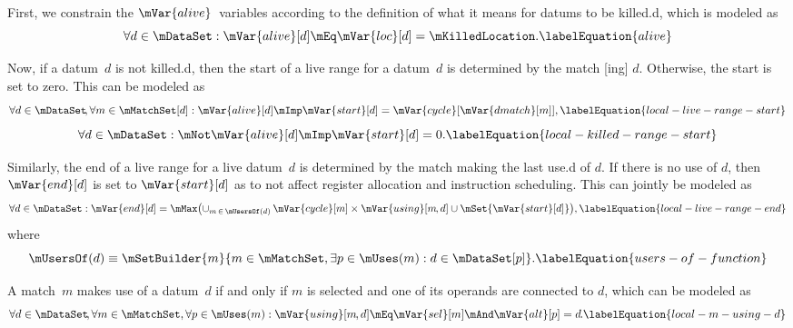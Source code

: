 First, we constrain the $\mVar{alive}$~\glspl{variable} according to the
definition of what it means for \glspl{datum} to be \gls{killed.d}, which is
modeled as
%
\begin{equation}
  \forall d \in \mDataSet :
  \mVar{alive}[d]
  \mEq
  \mVar{loc}[d] = \mKilledLocation.
  \labelEquation{alive}
\end{equation}

Now, if a \gls{datum}~$d$ is not \gls{killed.d}, then the start of a \gls{live
  range} for a \gls{datum}~$d$ is determined by the \gls{match}
[ing] $d$\hspace{-1pt}.
%
Otherwise, the start is set to zero.
%
This can be modeled as
%
\begin{equation}
  \forall d \in \mDataSet \!,
  \forall m \in \mMatchSet[d] :
  \mVar{alive}[d]
  \mImp
  \mVar{start}[d] = \mVar{cycle}[\mVar{dmatch}[m]],
  \labelEquation{local-live-range-start}
\end{equation}
%
\begin{equation}
  \forall d \in \mDataSet :
  \mNot\mVar{alive}[d]
  \mImp
  \mVar{start}[d] = 0.
  \labelEquation{local-killed-range-start}
\end{equation}

Similarly, the end of a \gls{live range} for a live \gls{datum}~$d$ is
determined by the \gls{match} making the last \gls{use.d} of $d$\hspace{-1pt}.
%
If there is no use of $d$, then $\mVar{end}[d]$ is set to $\mVar{start}[d]$ as
to not affect \gls{register allocation} and \gls{instruction scheduling}.
%
This can jointly be modeled as
%
\begin{equation}
  \forall d \in \mDataSet :
  \mVar{end}[d] =
  \mMax\!
  \left(
    \cup_{m \,\in\, \mUsersOf(d)} \,
    \mVar{cycle}[m]
    \times
    \mVar{using}[m \hspace{-1pt}, d]
    \cup
    \mSet{\mVar{start}[d]}
  \right)\!,
  \labelEquation{local-live-range-end}
\end{equation}
%
where
%
\begin{equation}
  \mUsersOf(d)
  \equiv
  \mSetBuilder{m}%
              {
                m \in \mMatchSet,
                \exists p \in \mUses(m) :
                d \in \mDataSet[p]
              }.
  \labelEquation{users-of-function}
\end{equation}

A \gls{match}~$m$ makes use of a \gls{datum}~$d$ if and only if $m$ is selected
and one of its \glspl{operand} are connected to $d$\hspace{-1pt}, which can be
modeled as
%
\begin{equation}
  \forall d \in \mDataSet \!,
  \forall m \in \mMatchSet,
  \forall p \in \mUses(m) :
  \mVar{using}[m \hspace{-1pt}, d]
  \mEq
  \mVar{sel}[m] \mAnd \mVar{alt}[p] = d \hspace{-1pt}.
  \labelEquation{local-m-using-d}
\end{equation}

